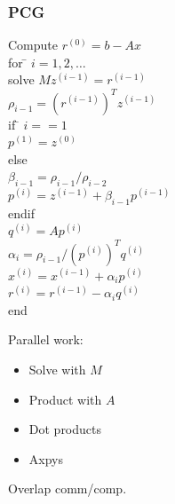 \documentclass{beamer}
\begin{document}
\begin{frame}[fragile]
  \frametitle{PCG}

\begin{minipage}{0.6\textwidth}
\begin{tabbing}
Compute $r^{(0)} = b - Ax$ \\
for \= $i = 1, 2, \ldots$ \\
\> solve $Mz^{(i-1)} = r^{(i-1)}$ \\
\> $\rho_{i-1} = (r^{(i-1)})^T z^{(i-1)}$ \\
\> if \= $i == 1$ \\
\> \> $p^{(1)} = z^{(0)}$ \\
\> else \\
\> \> $\beta_{i-1} = \rho_{i-1}/\rho_{i-2}$ \\
\> \> $p^{(i)} = z^{(i-1)} + \beta_{i-1} p^{(i-1)}$ \\
\> endif \\
\> $q^{(i)} = A p^{(i)}$ \\
\> $\alpha_i = \rho_{i-1} / (p^{(i)})^T q^{(i)}$ \\
\> $x^{(i)} = x^{(i-1)} + \alpha_i p^{(i)}$ \\
\> $r^{(i)} = r^{(i-1)} - \alpha_i q^{(i)}$ \\
end
\end{tabbing}
\end{minipage}
\begin{minipage}{0.35\textwidth}
  Parallel work:
  \begin{itemize}
    \item Solve with $M$
    \item Product with $A$
    \item Dot products
    \item Axpys
  \end{itemize}
  Overlap comm/comp.
\end{minipage}

\end{frame}
\end{document}
